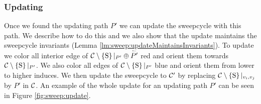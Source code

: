 \subsubsection{Updating}
  \label{sss:sweep:update}
  Once we found the updating path $P'$ we can update the sweepcycle with this path.
  We describe how to do this and we also show that the update maintains the sweepcycle invariants (Lemma \ref{lm:sweep:updateMaintainsInvariants}).
  To update we color all interior edge of $\mathcal{C} \setminus \left\lbrace {\mathrm{S}} \right\rbrace|_{P'} \oplus \accentset{\leftharpoonup}{P'}$ red and orient them towards $\mathcal{C} \setminus \left\lbrace {\mathrm{S}} \right\rbrace|_{P'}$.
  We also color all edges of $\mathcal{C} \setminus \left\lbrace {\mathrm{S}} \right\rbrace|_{P'}$  blue and orient them from lower to higher induces.
  We then update the sweepcycle to $\mathcal{C}'$ by replacing $\mathcal{C} \setminus \left\lbrace {\mathrm{S}} \right\rbrace|_{v_i,v_j}$ by $P'$ in $\mathcal{C}$.
  An example of the whole update for an updating path $P'$ can be seen in Figure \ref{fig:sweep:update}.

